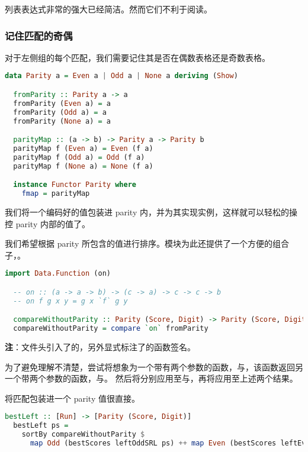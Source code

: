 \documentclass[./main.tex]{subfiles}
\begin{document}
列表表达式非常的强大已经简洁。然而它们不利于阅读。

\subsubsection*{记住匹配的奇偶}

对于左侧组的每个匹配，我们需要记住其是否在偶数表格还是奇数表格。

\begin{lstlisting}[language=Haskell]
  data Parity a = Even a | Odd a | None a deriving (Show)

  fromParity :: Parity a -> a
  fromParity (Even a) = a
  fromParity (Odd a) = a
  fromParity (None a) = a

  parityMap :: (a -> b) -> Parity a -> Parity b
  parityMap f (Even a) = Even (f a)
  parityMap f (Odd a) = Odd (f a)
  parityMap f (None a) = None (f a)

  instance Functor Parity where
    fmap = parityMap
\end{lstlisting}

我们将一个编码好的值包装进 parity 内，并为其实现实例，这样就可以轻松的操控 parity 内部的值了。

我们希望根据 parity 所包含的值进行排序。模块为此还提供了一个方便的组合子，。

\begin{lstlisting}[language=Haskell]
  import Data.Function (on)

  -- on :: (a -> a -> b) -> (c -> a) -> c -> c -> b
  -- on f g x y = g x `f` g y

  compareWithoutParity :: Parity (Score, Digit) -> Parity (Score, Digit) -> Ordering
  compareWithoutParity = compare `on` fromParity
\end{lstlisting}

\textbf{注}：文件头引入了的，另外显式标注了的函数签名。

为了避免理解不清楚，尝试将想象为一个带有两个参数的函数，与，该函数返回另一个带两个参数的函数，与。
然后将分别应用至与，再将应用至上述两个结果。

将匹配包装进一个 parity 值很直接。

\begin{lstlisting}[language=Haskell]
  bestLeft :: [Run] -> [Parity (Score, Digit)]
  bestLeft ps =
    sortBy compareWithoutParity $
      map Odd (bestScores leftOddSRL ps) ++ map Even (bestScores leftEvenSRL ps)
\end{lstlisting}
\end{document}
